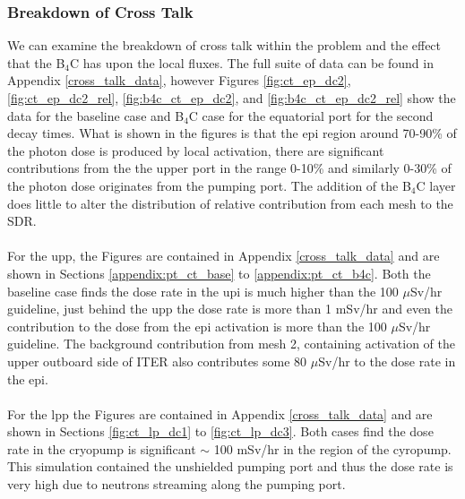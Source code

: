 \documentclass[12pt]{article}
\begin{document}
\subsubsection{Breakdown of Cross Talk}
We can examine the breakdown of cross talk within the problem and the effect 
that the B$_4$C has upon the local fluxes. The full suite of data can be found
in Appendix \ref{cross_talk_data}, however Figures \ref{fig:ct_ep_dc2},
\ref{fig:ct_ep_dc2_rel}, \ref{fig:b4c_ct_ep_dc2}, and \ref{fig:b4c_ct_ep_dc2_rel} 
show the data for the baseline case and B$_4$C case for the equatorial 
port for the second decay times. What is shown in the figures is that the \gls{epi}
region around 70-90\% of the photon dose is produced by local activation, there are
significant contributions from the the upper port in the range 0-10\% and 
similarly 0-30\% of the photon dose originates from the pumping port. The 
addition of the B$_4$C layer does little to alter the distribution of 
relative contribution from each mesh to the SDR.
\\
\\
For the \gls{upp}, the Figures are contained in Appendix \ref{cross_talk_data} and are 
shown in Sections \ref{appendix:pt_ct_base} to \ref{appendix:pt_ct_b4c}. 
Both the baseline case finds the dose rate in 
the \gls{upi} is much higher than the 100 $\mu$Sv/hr guideline, just behind the 
\gls{upp} the dose rate is more than 1 mSv/hr and even the contribution to the 
dose from the \gls{epi} activation is more than the 100 $\mu$Sv/hr guideline. 
The background contribution from mesh 2, containing activation of the upper
outboard side of ITER also contributes some 80 $\mu$Sv/hr to the dose rate in 
the \gls{epi}.
\\
\\
For the \gls{lpp} the Figures are contained in Appendix \ref{cross_talk_data} and are 
shown in Sections \ref{fig:ct_lp_dc1} to \ref{fig:ct_lp_dc3}. Both cases find the dose rate in 
the cryopump is significant $\sim$ 100 mSv/hr in the region of the cyropump. 
This simulation contained the unshielded pumping port and thus the dose rate is 
very high due to neutrons streaming along the pumping port. 
\end{document}
